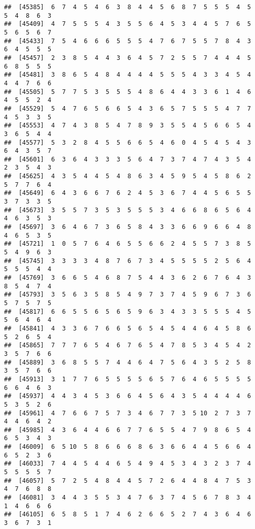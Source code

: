 \documentclass[
]{book}
\begin{document}
\begin{verbatim}
##  [45385]  6  7  4  5  4  6  3  8  4  4  5  6  8  7  5  5  5  4  5  5  4  8  6  3
##  [45409]  4  7  5  5  5  4  3  5  5  6  4  5  3  4  4  5  7  6  5  5  6  5  6  7
##  [45433]  7  5  4  6  6  6  5  5  5  4  7  6  7  5  5  7  8  4  3  6  4  5  5  5
##  [45457]  2  3  8  5  4  4  3  6  4  5  7  2  5  5  7  4  4  4  5  6  8  5  5  5
##  [45481]  3  8  6  5  4  8  4  4  4  4  5  5  5  4  3  3  4  5  4  4  4  7  6  6
##  [45505]  5  7  7  5  3  5  5  5  4  8  6  4  4  3  3  6  1  4  6  4  5  5  2  4
##  [45529]  5  4  7  6  5  6  6  5  4  3  6  5  7  5  5  5  4  7  7  4  5  3  3  5
##  [45553]  4  7  4  3  8  5  4  7  8  9  3  5  5  4  5  6  6  5  4  3  6  5  4  4
##  [45577]  5  3  2  8  4  5  5  6  6  5  4  6  0  4  5  4  5  4  3  6  4  3  5  7
##  [45601]  6  3  6  4  3  3  3  5  6  4  7  3  7  4  7  4  3  5  4  2  3  5  4  3
##  [45625]  4  3  5  4  4  5  4  8  6  3  4  5  9  5  4  5  8  6  2  5  7  7  6  4
##  [45649]  6  4  3  6  6  7  6  2  4  5  3  6  7  4  4  5  6  5  5  3  7  3  3  5
##  [45673]  3  5  5  7  3  5  3  5  5  5  3  4  6  6  8  6  5  6  4  4  6  3  5  3
##  [45697]  3  6  4  6  7  3  6  5  8  4  3  3  6  6  9  6  6  4  8  4  6  5  3  5
##  [45721]  1  0  5  7  6  4  6  5  5  6  6  2  4  5  5  7  3  8  5  5  4  9  6  3
##  [45745]  3  3  3  3  4  8  7  6  7  3  4  5  5  5  5  2  5  6  4  5  5  5  4  4
##  [45769]  3  6  6  5  4  6  8  7  5  4  4  3  6  2  6  7  6  4  3  8  5  4  7  4
##  [45793]  3  5  6  3  5  8  5  4  9  7  3  7  4  5  9  6  7  3  6  5  7  5  7  5
##  [45817]  6  6  5  5  6  5  6  5  9  6  3  4  3  3  5  5  5  4  5  5  6  4  6  4
##  [45841]  4  3  3  6  7  6  6  5  6  5  4  5  4  4  6  4  5  8  6  5  2  6  5  4
##  [45865]  7  7  7  6  5  4  6  7  6  5  4  7  8  5  3  4  5  4  2  3  5  7  6  6
##  [45889]  3  6  8  5  5  7  4  4  6  4  7  5  6  4  3  5  2  5  8  3  5  7  6  6
##  [45913]  3  1  7  7  6  5  5  5  5  6  5  7  6  4  6  5  5  5  5  6  6  4  6  3
##  [45937]  4  4  3  4  5  3  6  6  4  5  6  4  3  5  4  4  4  4  6  5  3  5  2  6
##  [45961]  4  7  6  6  7  5  7  3  4  6  7  7  3  5 10  2  7  3  7  4  4  6  4  2
##  [45985]  4  3  6  4  4  6  6  7  7  6  5  5  4  7  9  8  6  5  4  6  5  3  4  3
##  [46009]  6  5 10  5  8  6  6  6  8  6  3  6  6  4  4  5  6  6  4  6  5  2  3  6
##  [46033]  7  4  4  5  4  4  6  5  4  9  4  5  3  4  3  2  3  7  4  5  5  5  5  7
##  [46057]  5  7  2  5  4  8  4  4  5  7  2  6  4  4  8  4  7  5  3  4  7  6  8  8
##  [46081]  3  4  4  3  5  5  3  4  7  6  3  7  4  5  6  7  8  3  4  1  4  6  6  6
##  [46105]  6  5  8  5  1  7  4  6  2  6  6  5  2  7  4  3  6  4  6  3  6  7  3  1

\end{verbatim}
\end{document}
